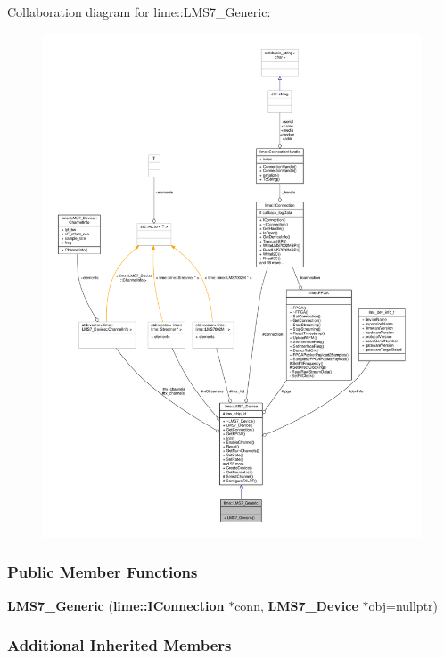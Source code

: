 Collaboration diagram for lime\+:\+:L\+M\+S7\+\_\+\+Generic\+:
\nopagebreak
\begin{figure}[H]
\begin{center}
\leavevmode
\includegraphics[width=350pt]{d1/df5/classlime_1_1LMS7__Generic__coll__graph}
\end{center}
\end{figure}
\subsubsection*{Public Member Functions}
\begin{DoxyCompactItemize}
\item 
{\bf L\+M\+S7\+\_\+\+Generic} ({\bf lime\+::\+I\+Connection} $\ast$conn, {\bf L\+M\+S7\+\_\+\+Device} $\ast$obj=nullptr)
\end{DoxyCompactItemize}
\subsubsection*{Additional Inherited Members}


